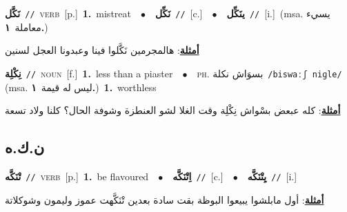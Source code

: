 \documentclass[10pt,a4paper,twoside]{article} %
\begin{document}
\begin{multicols}{2}
{\setlength\topsep{0pt}\textbf{\foreignlanguage{arabic}{نَكَّل}}\ {\color{gray}\texttt{//}\color{black}}\ \textsc{verb}\ [p.]\ \textbf{1.}~mistreat\ \ $\bullet$\ \ \setlength\topsep{0pt}\textbf{\foreignlanguage{arabic}{نَكِّل}}\ {\color{gray}\texttt{//}\color{black}}\ [c.]\ \ $\bullet$\ \ \setlength\topsep{0pt}\textbf{\foreignlanguage{arabic}{ينَكِّل}}\ {\color{gray}\texttt{//}\color{black}}\ [i.]\ \color{gray}(msa. \foreignlanguage{arabic}{يسيء معاملة}~\foreignlanguage{arabic}{\textbf{١.}})\color{black}\  \begin{flushright}\color{gray}\foreignlanguage{arabic}{\textbf{\underline{\foreignlanguage{arabic}{أمثلة}}}: هالمجرمين نَكَّلوا فينا وعبدونا العجل لسنين}\end{flushright}\color{black}} \vspace{2mm}

{\setlength\topsep{0pt}\textbf{\foreignlanguage{arabic}{نِكْلِة}}\ {\color{gray}\texttt{//}\color{black}}\ \textsc{noun}\ [f.]\ \textbf{1.}~less than a piaster\ \ $\bullet$\ \ \textsc{ph.} \color{gray} \foreignlanguage{arabic}{بسوَاش نكلة}\color{black}\ {\color{gray}\texttt{/{\sffamily biswaːʃ niɡle}/}\color{black}}\ \color{gray} (msa. \foreignlanguage{arabic}{ليس له قيمة}~\foreignlanguage{arabic}{\textbf{١.}})\color{black}\ \textbf{1.}~worthless\  \begin{flushright}\color{gray}\foreignlanguage{arabic}{\textbf{\underline{\foreignlanguage{arabic}{أمثلة}}}: كله عبعض بسْواش نِكْلِة وقت الغلا لشو العنطزة وشوفة الحال؟ كلنا ولاد تسعة}\end{flushright}\color{black}} \vspace{2mm}

\vspace{-3mm}
\subsection*{\color{blue}\foreignlanguage{arabic}{ن.ك.ه}\color{blue}{}} 

{\setlength\topsep{0pt}\textbf{\foreignlanguage{arabic}{تْنَكَّه}}\ {\color{gray}\texttt{//}\color{black}}\ \textsc{verb}\ [p.]\ \textbf{1.}~be flavoured\ \ $\bullet$\ \ \setlength\topsep{0pt}\textbf{\foreignlanguage{arabic}{اِتْنَكَّه}}\ {\color{gray}\texttt{//}\color{black}}\ [c.]\ \ $\bullet$\ \ \setlength\topsep{0pt}\textbf{\foreignlanguage{arabic}{يِتْنَكَّه}}\ {\color{gray}\texttt{//}\color{black}}\ [i.]\  \begin{flushright}\color{gray}\foreignlanguage{arabic}{\textbf{\underline{\foreignlanguage{arabic}{أمثلة}}}: أول مابلشوا يبيعوا البوظة بقت سادة بعدين تْنَكَّهت عموز وليمون وشوكلاتة}\end{flushright}\color{black}} \vspace{2mm}


\end{multicols}
\end{document}
